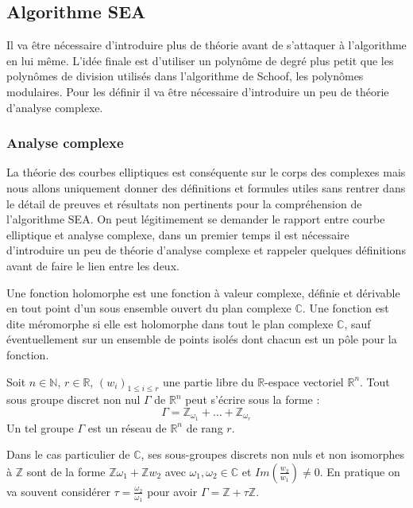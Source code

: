 \documentclass{article}
\begin{document}
\subsection{Algorithme SEA}
Il va être nécessaire d'introduire plus de théorie avant de s'attaquer à l'algorithme en lui même. L'idée finale est d'utiliser un polynôme de degré plus petit que les polynômes de division utilisés dans l'algorithme de Schoof, les polynômes modulaires. Pour les définir il va être nécessaire d'introduire un peu de théorie d'analyse complexe.


\subsubsection{Analyse complexe}
La théorie des courbes elliptiques est conséquente sur le corps des complexes mais nous allons uniquement donner des définitions et formules utiles sans rentrer dans le détail de preuves et résultats non pertinents pour la compréhension de l'algorithme SEA. On peut légitimement se demander le rapport entre courbe elliptique et analyse complexe, dans un premier temps il est nécessaire d'introduire un peu de théorie d'analyse complexe et rappeler quelques définitions avant de faire le lien entre les deux.

\begin{defi}
Une fonction holomorphe est une fonction à valeur complexe, définie et dérivable en tout point d'un sous ensemble ouvert du plan complexe $\mathbb{C}$. Une fonction est dite méromorphe si elle est holomorphe dans tout le plan complexe $\mathbb{C}$, sauf éventuellement sur un ensemble de points isolés dont chacun est un pôle pour la fonction.
\end{defi}

\begin{prop}
Soit $n \in \mathbb{N}$, $r \in \mathbb{R}$, $(w_i)_{1 \leq i \leq r}$ une partie libre du $\mathbb{R}$-espace vectoriel $\mathbb{R}^n$. Tout sous groupe discret non nul $\Gamma$ de $\mathbb{R}^n$ peut s'écrire sous la forme :
\begin{equation*}
\Gamma = \mathbb{Z}_{\omega_1} + \ldots + \mathbb{Z}_{\omega_r}
\end{equation*}
Un tel groupe $\Gamma$ est un réseau de $\mathbb{R}^n$ de rang $r$.
\end{prop}
Dans le cas particulier de $\mathbb{C}$, ses sous-groupes discrets non nuls et non isomorphes à $\mathbb{Z}$ sont de la forme $\mathbb{Z}\omega_1 + \mathbb{Z}w_2$ avec $\omega_1, \omega_2 \in \mathbb{C}$ et $Im(\frac{w_2}{w_1}) \ne 0$. En pratique on va souvent considérer $\tau = \frac{\omega_2}{\omega_1}$ pour avoir $\Gamma = \mathbb{Z} + \tau \mathbb{Z}$.
\end{document}
